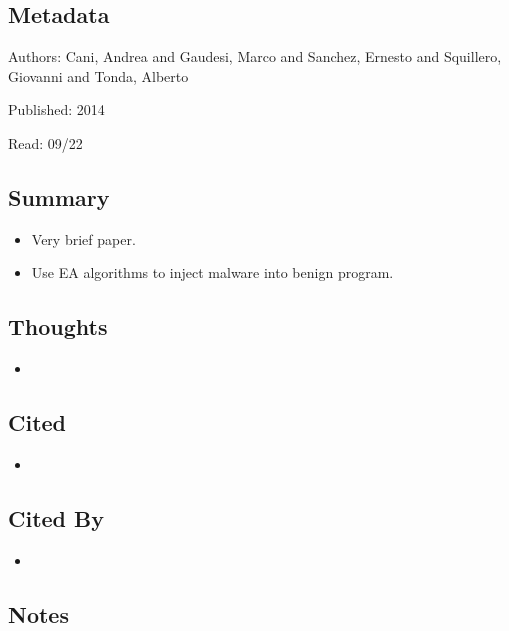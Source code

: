 \documentclass{article}
\begin{document}
\subsection*{Metadata}

\noindent Authors: Cani, Andrea and Gaudesi, Marco and Sanchez, Ernesto and Squillero, Giovanni and Tonda, Alberto

\noindent Published: 2014

\noindent Read: 09/22

\subsection*{Summary}
\begin{itemize}
	\item Very brief paper.
	\item Use EA algorithms to inject malware into benign program.
\end{itemize}

\subsection*{Thoughts}
\begin{itemize}
	\item
\end{itemize}

\subsection*{Cited}
\begin{itemize}
	\item
\end{itemize}

\subsection*{Cited By}
\begin{itemize}
	\item
\end{itemize}

\subsection*{Notes}
\end{document}
